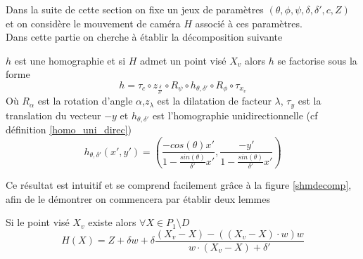 Dans la suite de cette section on fixe un jeux de paramètres $(\theta,\phi,\psi,\delta,\delta',c,Z)$ et on considère le mouvement de caméra $H$ associé à ces paramètres.\\
Dans cette partie on cherche à établir la décomposition suivante
\begin{prop}
$h$ est une homographie et si $H$ admet un point visé $X_v$ alors $h$ se factorise sous la forme
\begin{equation}
h = \tau_{c} \circ z_{\frac{\delta}{\delta'}}  \circ R_{\psi} \circ h_{\theta,\delta'} \circ R_{\phi} \circ \tau_{x_{v}}
\label{formul_decomp}
\end{equation}
Où $R_{\alpha}$ est la rotation d'angle $\alpha$,$z_\lambda$ est la dilatation de facteur $\lambda$, $\tau_y$ est  la translation du vecteur $-y$ et $h_{\theta,\delta'}$ est l'homographie unidirectionnelle (cf définition \ref{homo_uni_direc})
\begin{equation}
h_{\theta,\delta'}(x',y')=\left(\frac{-cos(\theta)x'}{1-\frac{sin(\theta)}{\delta'}x'} ,\frac{-y'}{1-\frac{sin(\theta)}{\delta'}x'}\right)
\label{mise_perspective}
\end{equation}
\label{prop_decomp}
\end{prop}
Ce résultat est intuitif et se comprend facilement grâce à la figure \ref{shmdecomp}, afin de le démontrer on commencera par établir deux lemmes

\begin{lem}Si le point visé $X_v$ existe alors
$\forall X \in P_1 \setminus D$
\begin{equation}
H(X)=Z+\delta w+\delta \frac{(X_v-X)-\left((X_v-X)\cdot w\right) w}{w\cdot (X_v-X)+\delta'}
\label{homo_form_geo}
\end{equation}
\end{lem}

